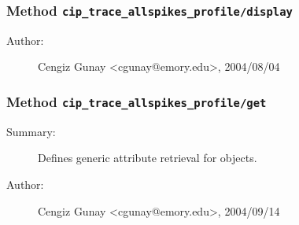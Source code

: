 \subsubsection[Method \texttt{display}]{Method \texttt{cip\_trace\_allspikes\_profile/display}}%
%
\label{ref_cip_trace_allspikes_profile__display}%
\hypertarget{ref_cip_trace_allspikes_profile__display}{}%
\begin{description}
%
%
%
%
%
%
%
\item[Author:]%
Cengiz Gunay <cgunay@emory.edu>, 2004/08/04
%
\end{description}
\methodline%
\subsubsection[Method \texttt{get}]{Method \texttt{cip\_trace\_allspikes\_profile/get}}%
%
\label{ref_cip_trace_allspikes_profile__get}%
\hypertarget{ref_cip_trace_allspikes_profile__get}{}%
\begin{description}
\item[Summary:]Defines generic attribute retrieval for objects.
%
%
%
%
%
%
%
\item[Author:]%
Cengiz Gunay <cgunay@emory.edu>, 2004/09/14
%
\end{description}
\methodline%
